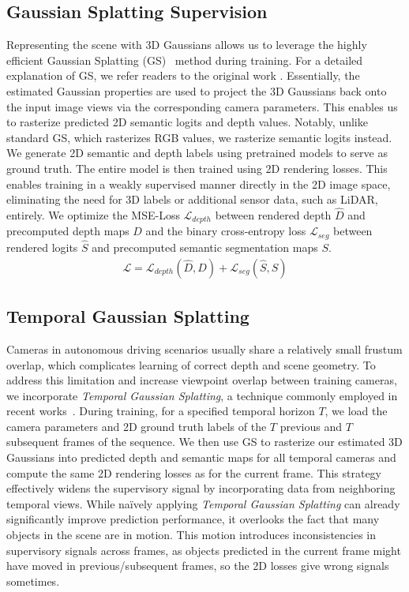 \documentclass[10pt,twocolumn,letterpaper]{article}
\begin{document}
\subsection{Gaussian Splatting Supervision} \label{sec:gaussian_splatting}
Representing the scene with 3D Gaussians allows us to leverage the highly efficient Gaussian Splatting (GS)~\cite{kerbl20233d} method during training. 
For a detailed explanation of GS, we refer readers to the original work \cite{kerbl20233d}.
Essentially, the estimated Gaussian properties are used to project the 3D Gaussians back onto the input image views via the corresponding camera parameters.
This enables us to rasterize predicted 2D semantic logits and depth values.
Notably, unlike standard GS, which rasterizes RGB values, we rasterize semantic logits instead.
We generate 2D semantic and depth labels using pretrained models to serve as ground truth. 
The entire model is then trained using 2D rendering losses. 
This enables training in a weakly supervised manner directly in the 2D image space, eliminating the need for 3D labels or additional sensor data, such as LiDAR, entirely.
We optimize the MSE-Loss $\mathcal{L}_{depth}$ between rendered depth $\hat{D}$ and precomputed depth maps $D$ and the binary cross-entropy loss $\mathcal{L}_{seg}$ between rendered logits $\hat{S}$ and precomputed semantic segmentation maps $S$.
 \begin{align}
    \mathcal{L} = \mathcal{L}_{depth}(\hat{D}, D) + \mathcal{L}_{seg}(\hat{S}, S) 
\end{align}


\subsection{Temporal Gaussian Splatting} \label{sec:temp_splatting}
Cameras in autonomous driving scenarios usually share a relatively small frustum overlap, which complicates learning of correct depth and scene geometry.
To address this limitation and increase viewpoint overlap between training cameras, we incorporate \emph{Temporal Gaussian Splatting}, a technique commonly employed in recent works~\cite{pan2023renderocc, boeder2024occflownet, gan2024gaussianocc}.
During training, for a specified temporal horizon $T$, we load the camera parameters and 2D ground truth labels of the $T$ previous and $T$ subsequent frames of the sequence.
We then use GS to rasterize our estimated 3D Gaussians into predicted depth and semantic maps for all temporal cameras and compute the same 2D rendering losses as for the current frame.
This strategy effectively widens the supervisory signal by incorporating data from neighboring temporal views.
While na\"ively applying \emph{Temporal Gaussian Splatting} can already significantly improve prediction performance, it overlooks the fact that many objects in the scene are in motion.
This motion introduces inconsistencies in supervisory signals across frames, as objects predicted in the current frame might have moved in previous/subsequent frames, so the 2D losses give wrong signals sometimes.
\end{document}
